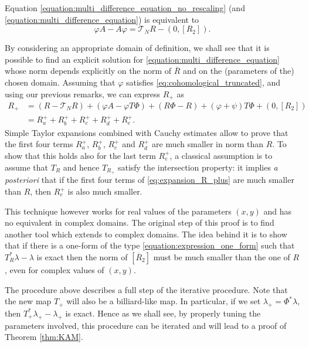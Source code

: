 \documentclass[10pt]{article}
\begin{document}
Equation \eqref{equation:multi_difference_equation_no_rescaling} (and \eqref{equation:multi_difference_equation}) is equivalent to
\begin{equation}
    \label{eq:cohomological_truncated}
    \varphi A - A\varphi  %
    = \mathscr T_N R - (0, [R_2]).
\end{equation}

By considering an appropriate domain of definition, we shall see that it is possible to find an explicit solution for \eqref{equation:multi_difference_equation} whose norm depends explicitly on the norm of $\overline R$ and on the (parameters of the) chosen domain. 
Assuming that $\varphi$ satisfies \eqref{eq:cohomological_truncated}, and using our previous remarks, we can express $R_+$ as
\begin{equation}
\label{eq:expansion_R_plus}
\begin{aligned}
    R_+ & =   (R - \mathscr T_NR) + (\varphi A - \varphi T\Phi) + (R\Phi - R) + (\varphi + \psi)T \Phi + (0, [R_2]) \\
    & = R_a^+ + R_b^+ + R_c^+ + R_d^+ + R_e^+.
    \end{aligned}
\end{equation}
Simple Taylor expansions combined with Cauchy estimates allow to prove that the first four terms $R_a^+$, $R_b^+$, $R_c^+$ and $R_d^+$ are much smaller in norm than $R$. To show that this holds also for the last term $R_e^+$, a classical assumption is to assume that $T_R$ and hence $T_{R_+}$ satisfy the intersection property: it implies \textit{a posteriori} that if the first four terms of \eqref{eq:expansion_R_plus} are much smaller than $R$, then $R_e^+$ is also much smaller.

This technique however works for real values of the parameters $(x,y)$ and has no equivalent in complex domains. The original step of this proof is to find another tool which extends to complex domains.  The idea behind it is to show that if there is a one-form of the type \eqref{equation:expression_one_form} such that $T_R^{\ast}\lambda-\lambda$ is exact then the norm of $[\overline R_2]$ must be much smaller than the one of $R$, even for complex values of $(x,y)$. 

The procedure above describes a full step of the iterative procedure. Note that the new map $T_+$ will also be a billiard-like map. In particular, if we set $\lambda_+=\Phi^\ast\lambda$, then $T_+^\ast\lambda_+-\lambda_+$ is exact. Hence as we shall see, by properly tuning the parameters involved, this procedure can be iterated and will lead to a proof of Theorem \ref{thm:KAM}.
\end{document}
